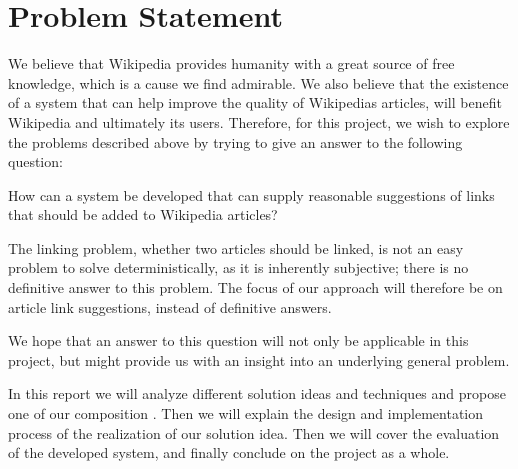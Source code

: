 \section{Problem Statement}\label{sec:problem_statement}

We believe that Wikipedia provides humanity with a great source of free knowledge, which is a cause we find admirable. We also believe that the existence of a system that can help improve the quality of Wikipedias articles, will benefit Wikipedia and ultimately its users. Therefore, for this project, we wish to explore the problems described above by trying to give an answer to the following question:

\begin{formal}
How can a system be developed that can supply reasonable suggestions of links that should be added to Wikipedia articles?
\end{formal}

The linking problem, whether two articles should be linked, is not an easy problem to solve deterministically, as it is inherently subjective; there is no definitive answer to this problem. The focus of our approach will therefore be on article link suggestions, instead of definitive answers. %

We hope that an answer to this question will not only be applicable in this project, but might provide us with an insight into an underlying general problem.

In this report we will analyze different solution ideas and techniques and propose one of our composition . Then we will explain the design and implementation process of the realization of our solution idea. Then we will cover the evaluation of the developed system, and finally conclude on the project as a whole.







